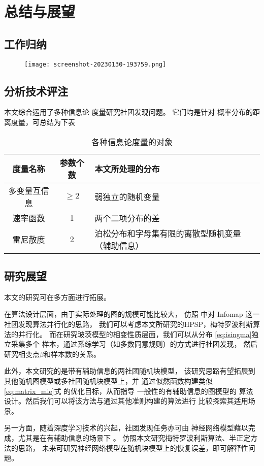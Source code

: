 \chapter{总结与展望}
\section{工作归纳}

\begin{figure}[!ht]
    \texttt{[image: screenshot-20230130-193759.png]}
\end{figure}

\section{分析技术评注}
本文综合运用了多种信息论
度量研究社团发现问题。
它们均是针对
概率分布的距离度量，可总结为下表
\begin{table}[!ht]
    \centering
  \begin{tabular}{ccp{5cm}}
    \hline
     度量名称    &   参数个数 &   本文所处理的分布 \\
    \hline
     多变量互信息 &    $\geq 2$ &    弱独立的随机变量  \\
     速率函数     &    1 &     两个二项分布的差  \\
     雷尼散度     &    2 &    泊松分布和字母集有限的离散型随机变量（辅助信息） \\
    \hline
  \end{tabular}
  \caption{各种信息论度量的对象}\label{tab:info_metric}
\end{table}
  
\section{研究展望}
本文的研究可在多方面进行拓展。

在算法设计层面，由于实际处理的图的规模可能比较大，
仿照 \citet{faysal2021parallel} 中对 Infomap 这一社团发现算法并行化的思路，
我们可以考虑本文所研究的HPSP，梅特罗波利斯算法的并行化。
而在研究玻茨模型的相变性质层面，我们可以从分布
\eqref{eq:isingma}独立采集多个
样本，通过系综学习（如多数同意规则）的方式进行社团发现，
然后研究相变点$\beta$和样本数的关系。

此外，本文研究的是带有辅助信息的两社团随机块模型，
该研究思路有望拓展到其他随机图模型或多社团随机块模型上，并
通过似然函数构建类似\eqref{eq:matrix_mle}式
的优化目标，从而指导
一般性的有辅助信息的图模型的
算法设计。然后我们可以将该方法与通过其他准则\cite{chunaev2020community}构建的算法进行
比较探索其适用场景。

另一方面，随着深度学习技术的兴起，社团发现任务亦可由
神经网络模型藉以完成，尤其是在有辅助信息的场景下 \cite{cao2018incorporating}。
仿照本文研究梅特罗波利斯算法、半正定方法的思路，
未来可研究神经网络模型在随机块模型上的恢复误差，即可解释性问题。